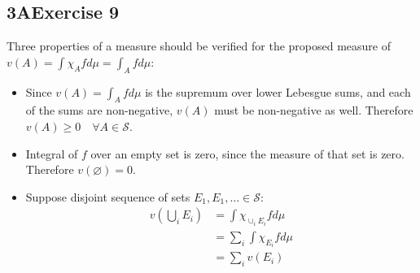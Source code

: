 \documentclass[12pt, letterpaper]{article}
\renewcommand{\S}{\mathcal{S}}
\begin{document}
\subsection*{3\hspace{1pt}A\hspace{20pt}Exercise 9}
Three properties of a measure should be verified for the proposed measure of $v(A)=\int \chi_Afd\mu=\int_Afd\mu$:
\begin{itemize}
    \item Since $v(A)=\int_Afd\mu$ is the supremum over lower Lebesgue sums, and each of the sums are non-negative, $v(A)$ must be non-negative as well. Therefore $v(A)\geq 0\quad\forall A\in\S$.
    
    \item Integral of $f$ over an empty set is zero, since the measure of that set is zero. Therefore $v(\varnothing)=0$.
    
    \item
    Suppose disjoint sequence of sets $E_1, E_1, \dots\in \S$:
    \begin{align*}
        v(\bigcup_i E_i)&=\int\chi_{\cup_i E_i}f d\mu\\
        &=\sum_i\int\chi_{E_i}f d\mu\\
        &=\sum_i v(E_i)
    \end{align*}

    
\end{itemize}
\clearpage
\end{document}
